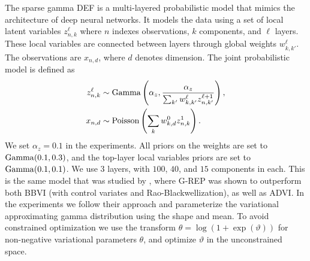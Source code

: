 The sparse gamma \gls{DEF} \citep{Ranganath2015} is a multi-layered probabilistic model that mimics the architecture of deep neural networks. It models the data using a set of local latent variables $z_{n,k}^\ell$ where $n$ indexes observations, $k$ components, and $\ell$ layers. These local variables are connected between layers through global weights $w_{k,k'}^\ell$. The observations are $x_{n,d}$, where $d$ denotes dimension. The joint probabilistic model is defined as
\begin{align}
\begin{split}
z_{n,k}^\ell &\sim \operatorname*{Gamma}\left(\alpha_z,\frac{\alpha_z}{\sum_{k'} w_{k,k'}^\ell z_{n,k'}^{\ell+1}} \right), \\
x_{n,d} &\sim \mathrm{Poisson}\left(\sum_{k} w_{k,d}^0 z_{n,k}^1 \right).
\end{split}
\end{align}
We set $\alpha_z=0.1$ in the experiments. All priors on the weights are set to $\operatorname*{Gamma}(0.1,0.3)$, and the top-layer local variables priors are set to $\operatorname*{Gamma}(0.1,0.1)$. We use $3$ layers, with $100$, $40$, and $15$ components in each. 
This is the same model that was studied by \citet{RuizTB2016}, where \gls{G-REP} was shown to outperform both \gls{BBVI} (with control variates and Rao-Blackwellization), as well as \gls{ADVI}. In the experiments we follow their approach and parameterize the variational approximating gamma distribution using the shape and mean. To avoid constrained optimization we use the transform $\theta = \log(1+\exp(\vartheta))$ for non-negative variational parameters $\theta$, and optimize $\vartheta$ in the unconstrained space.


